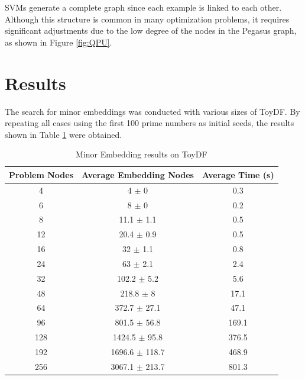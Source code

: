 SVMs generate a complete graph since each example is linked to each other. 
Although this structure is common in many optimization problems, it requires significant adjustments due to the low degree of the nodes in the Pegasus graph, as shown in Figure \ref{fig:QPU}.

\section{Results}\label{sec:qpu-res}

The search for minor embeddings was conducted with various sizes of ToyDF. 
By repeating all cases using the first 100 prime numbers as initial seeds, the results shown in Table \ref{tab:scale} were obtained.

\begin{table}[H]
    \centering
    \begin{tabular}{ccc}
        \toprule
        Problem Nodes & Average Embedding Nodes & Average Time (s) \\
        \midrule
        \rowcolor{lightgray} 4 & 4 $\pm$ 0 & 0.3 \\
        6 & 8 $\pm$ 0 & 0.2 \\ 
        \rowcolor{lightgray} 8 & 11.1 $\pm$ 1.1 & 0.5 \\ 
        12 & 20.4 $\pm$ 0.9 & 0.5 \\ 
        \rowcolor{lightgray} 16 & 32 $\pm$ 1.1 & 0.8 \\ 
        24 & 63 $\pm$ 2.1 & 2.4 \\ 
        \rowcolor{lightgray} 32 & 102.2 $\pm$ 5.2 & 5.6 \\ 
        48 & 218.8 $\pm$ 8 & 17.1 \\ 
        \rowcolor{lightgray} 64 & 372.7 $\pm$ 27.1 & 47.1 \\ 
        96 & 801.5 $\pm$ 56.8 & 169.1 \\ 
        \rowcolor{lightgray} 128 & 1424.5 $\pm$ 95.8 & 376.5 \\ 
        192 & 1696.6 $\pm$ 118.7 & 468.9 \\ 
        \rowcolor{lightgray} 256 & 3067.1 $\pm$ 213.7 & 801.3 \\
        \bottomrule
    \end{tabular}
    \caption{Minor Embedding results on ToyDF}
    \label{tab:scale}
\end{table}

